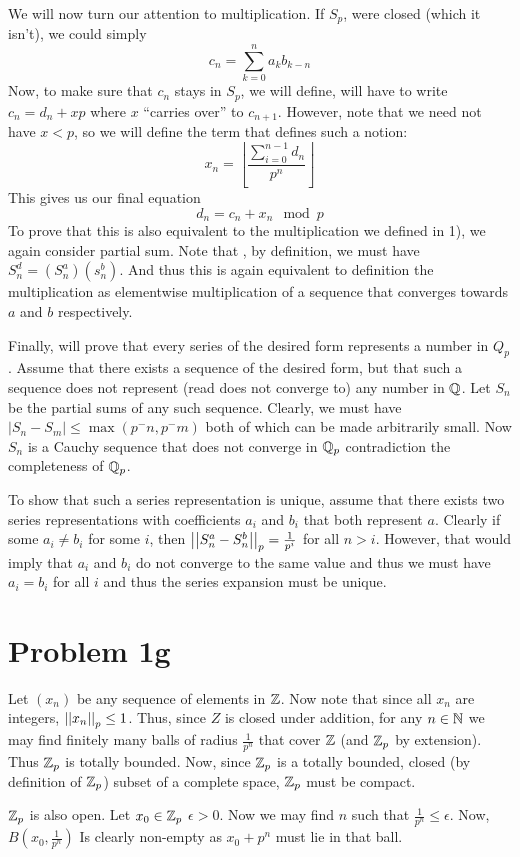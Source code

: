 We will now turn our attention to multiplication. If $S_p$, were closed (which it isn't), we could simply 
\[ c_n = \sum_{k=0}^n a_kb_{k-n} \]
Now, to make sure that $c_n$ stays in $S_p$, we will define, will have to write $c_n=d_n+x p$ where $x$ ``carries over'' to $c_{n+1}$. However, note that we need not have $x<p$, so we will define the term that defines such a notion:
\[ x_n = \left\lfloor \dfrac{\sum_{i=0}^{n-1} d_n}{p^n} \right\rfloor \]
This gives us our final equation
\[ d_n = c_n + x_n \mod{p} \]
To prove that this is also equivalent to the multiplication we defined in 1), we again consider partial sum. Note that , by definition, we must have $S^d_n = (S^a_n)(s^b_n)$. And thus this is again equivalent to definition the multiplication as elementwise multiplication of a sequence that converges towards $a$ and $b$ respectively. \par
Finally, will prove that every series of the desired form represents a number in $Q_p$. Assume that there exists a sequence of the desired form, but that such a sequence does not represent (read does not converge to) any number in $\mathbb{Q}$. Let $S_n$ be the partial sums of any such sequence. Clearly, we must have $|S_n-S_m|\leq \max(p^-n,p^-m)$ both of which can be made arbitrarily small. Now $S_n$ is a Cauchy sequence that does not converge in $\mathbb{Q}_p$ contradiction the completeness of $\mathbb{Q}_p$. \par 
To show that such a series representation is unique, assume that there exists two series representations with coefficients $a_i$ and $b_i$ that both represent $a$. Clearly if some $a_i\neq b_i$ for some $i$, then $\left|\left| S^a_n - S^b_n \right|\right|_p = \frac{1}{p^i}$ for all $n>i$. However, that would imply that $a_i$ and $b_i$ do not converge to the same value and thus we must have $a_i=b_i$ for all $i$ and thus the series expansion must be unique. 

\section*{Problem 1g}
Let $(x_n)$ be any sequence of elements in $\mathbb{Z}$. Now note that since all $x_n$ are integers, $\left|\left| x_n \right|\right|_p \leq 1$. Thus, since $Z$ is closed under addition, for any  $n\in \mathbb{N}$ we may find finitely many balls of radius $\frac{1}{p^n}$ that cover $\mathbb{Z}$ (and $\mathbb{Z}_p$ by extension). Thus $\mathbb{Z}_p$ is totally bounded. Now, since $\mathbb{Z}_p$ is a totally bounded, closed (by definition of $\mathbb{Z}_p$) subset of a complete space, $\mathbb{Z}_p$ must be compact. \par 
$\mathbb{Z}_p$ is also open. Let $x_0\in \mathbb{Z}_p$ $\epsilon>0$. Now we may find $n$ such that $\frac{1}{p^n}\leq \epsilon$. Now, $B(x_0, \frac{1}{p^n})$ Is clearly non-empty as $x_0+p^n$ must lie in that ball.


